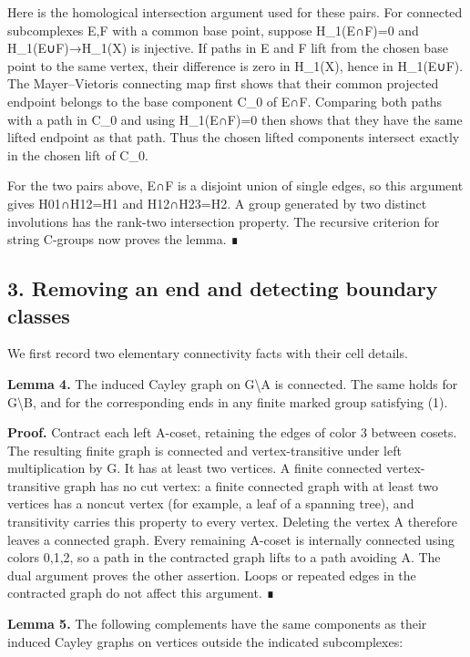 \documentclass[
  11pt,
  a4paper,
]{article}
\begin{document}
Here is the homological intersection argument used for these pairs. For
connected subcomplexes E,F with a common base point, suppose H\_1(E∩F)=0
and H\_1(E∪F)→H\_1(X) is injective. If paths in E and F lift from the
chosen base point to the same vertex, their difference is zero in
H\_1(X), hence in H\_1(E∪F). The Mayer--Vietoris connecting map first
shows that their common projected endpoint belongs to the base component
C\_0 of E∩F. Comparing both paths with a path in C\_0 and using
H\_1(E∩F)=0 then shows that they have the same lifted endpoint as that
path. Thus the chosen lifted components intersect exactly in the chosen
lift of C\_0.

For the two pairs above, E∩F is a disjoint union of single edges, so
this argument gives H01∩H12=H1 and H12∩H23=H2. A group generated by two
distinct involutions has the rank-two intersection property. The
recursive criterion for string C-groups now proves the lemma. ∎

\subsection{3. Removing an end and detecting boundary
classes}\label{removing-an-end-and-detecting-boundary-classes}

We first record two elementary connectivity facts with their cell
details.

\textbf{Lemma 4.} The induced Cayley graph on G\textbackslash A is
connected. The same holds for G\textbackslash B, and for the
corresponding ends in any finite marked group satisfying (1).

\textbf{Proof.} Contract each left A-coset, retaining the edges of color
3 between cosets. The resulting finite graph is connected and
vertex-transitive under left multiplication by G. It has at least two
vertices. A finite connected vertex-transitive graph has no cut vertex:
a finite connected graph with at least two vertices has a noncut vertex
(for example, a leaf of a spanning tree), and transitivity carries this
property to every vertex. Deleting the vertex A therefore leaves a
connected graph. Every remaining A-coset is internally connected using
colors 0,1,2, so a path in the contracted graph lifts to a path avoiding
A. The dual argument proves the other assertion. Loops or repeated edges
in the contracted graph do not affect this argument. ∎

\textbf{Lemma 5.} The following complements have the same components as
their induced Cayley graphs on vertices outside the indicated
subcomplexes:
\end{document}
